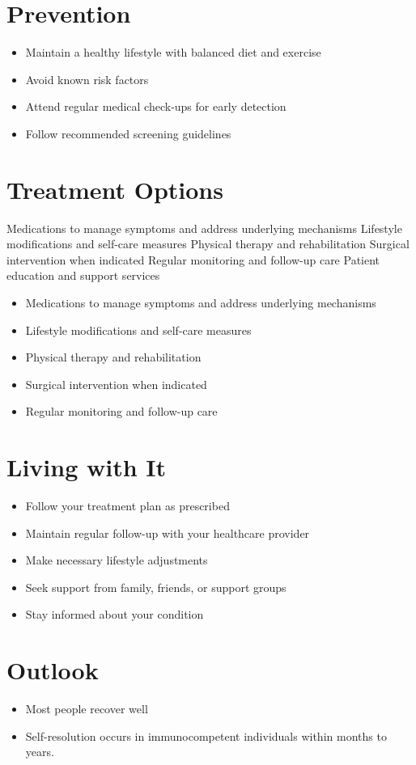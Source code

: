 \section{Prevention}
\begin{itemize}[noitemsep]
  \item Maintain a healthy lifestyle with balanced diet and exercise
  \item Avoid known risk factors
  \item Attend regular medical check-ups for early detection
  \item Follow recommended screening guidelines
\end{itemize}
\section{Treatment Options}
Medications to manage symptoms and address underlying mechanisms Lifestyle modifications and self-care measures Physical therapy and rehabilitation Surgical intervention when indicated Regular monitoring and follow-up care Patient education and support services

\begin{itemize}[noitemsep]
  \item Medications to manage symptoms and address underlying mechanisms
  \item Lifestyle modifications and self-care measures
  \item Physical therapy and rehabilitation
  \item Surgical intervention when indicated
  \item Regular monitoring and follow-up care
\end{itemize}
\section{Living with It}
\begin{itemize}[noitemsep]
  \item Follow your treatment plan as prescribed
  \item Maintain regular follow-up with your healthcare provider
  \item Make necessary lifestyle adjustments
  \item Seek support from family, friends, or support groups
  \item Stay informed about your condition
\end{itemize}
\section{Outlook}
\begin{itemize}[noitemsep]
  \item Most people recover well
  \item Self-resolution occurs in immunocompetent individuals within months to years.
\end{itemize}
